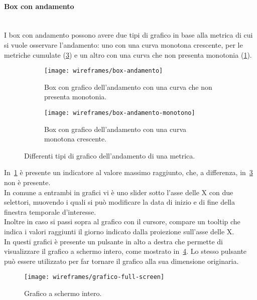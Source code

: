 \documentclass[../../../main.tex]{subfiles}
\begin{document}
\paragraph{Box con andamento}\mbox{}\\
I box con andamento possono avere due tipi di grafico in base alla metrica di cui si vuole osservare l'andamento: uno con una curva monotona crescente, per le metriche cumulate (\ref{fig:box-andamento-monotono}) e un altro con una curva che non presenta monotonia (\ref{fig:box-andamento-no-monotonia}). 
\begin{figure}[H]
    \begin{subfigure}[b]{0.5\textwidth}
        \centering
        \texttt{[image: wireframes/box-andamento]}
        \caption{Box con grafico dell'andamento con una curva che non presenta monotonia.}\label{fig:box-andamento-no-monotonia}
    \end{subfigure}
\hfill
    \begin{subfigure}[b]{0.5\textwidth}
        \centering
        \texttt{[image: wireframes/box-andamento-monotono]}
        \caption{Box con grafico dell'andamento con una curva monotona crescente.}
        \label{fig:box-andamento-monotono}
    \end{subfigure}
    \caption{Differenti tipi di grafico dell'andamento di una metrica.}
\end{figure}

In~\ref{fig:box-andamento-no-monotonia} è presente un indicatore al valore massimo raggiunto, che, a differenza, in~\ref{fig:box-andamento-monotono} non è presente.\\
In comune a entrambi in grafici vi è uno slider sotto l'asse delle X con due selettori, muovendo i quali si può modificare la data di inizio e di fine della finestra temporale d'interesse.\\
Inoltre in caso si passi sopra al grafico con il cursore, compare un tooltip che indica i valori raggiunti il giorno indicato dalla proiezione sull'asse delle X.\\
In questi grafici è presente un pulsante in alto a destra che permette di visualizzare il grafico a schermo intero, come mostrato in~\ref{fig:grafico-full-screen}. Lo stesso pulsante può essere utilizzato per far tornare il grafico alla sua dimensione originaria.
\begin{figure}[H]
    \centering
    \texttt{[image: wireframes/grafico-full-screen]}
    \caption{Grafico a schermo intero.}
    \label{fig:grafico-full-screen}
\end{figure}
\end{document}
